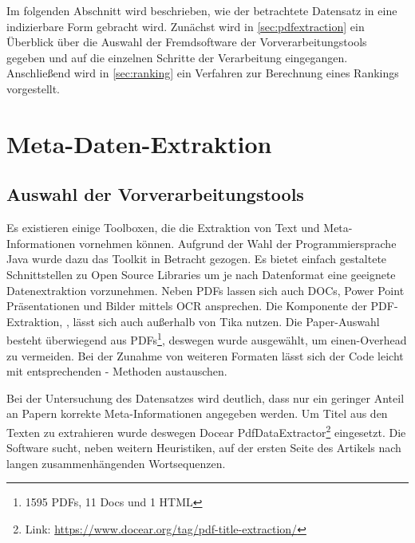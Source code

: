 


Im folgenden Abschnitt wird beschrieben, wie der betrachtete Datensatz in eine indizierbare Form
gebracht wird. Zunächst wird in \autoref{sec:pdfextraction} ein
Überblick über die Auswahl der Fremdsoftware der Vorverarbeitungstools
gegeben und auf die einzelnen Schritte der Verarbeitung eingegangen. Anschließend wird
in \autoref{sec:ranking} ein Verfahren zur Berechnung eines Rankings vorgestellt.



\section{Meta-Daten-Extraktion}\label{sec:pdfextraction}


\subsection{Auswahl der Vorverarbeitungstools}\label{sec:preprosselection}

Es existieren einige Toolboxen, die die Extraktion von Text und
Meta-Informationen vornehmen können.  Aufgrund der Wahl der
Programmiersprache Java wurde dazu das \tika Toolkit in Betracht
gezogen. Es bietet einfach gestaltete Schnittstellen zu Open Source
Libraries um je nach Datenformat eine geeignete Datenextraktion
vorzunehmen. Neben PDFs lassen sich auch DOCs, Power Point
Präsentationen und Bilder mittels OCR ansprechen. Die Komponente der
PDF-Extraktion, \pdfbox, lässt sich auch außerhalb von Tika nutzen.
Die Paper-Auswahl besteht überwiegend aus PDFs\footnote{1595 PDFs, 11
Docs und 1 HTML}, deswegen wurde \pdfbox ausgewählt, um einen-Overhead
zu vermeiden. Bei der Zunahme von weiteren Formaten lässt sich der
Code leicht mit entsprechenden \tika - Methoden austauschen.

Bei der Untersuchung des Datensatzes wird deutlich, dass nur ein
geringer Anteil an Papern korrekte Meta-Informationen angegeben werden. Um
Titel aus den Texten zu extrahieren wurde deswegen Docear
PdfDataExtractor\footnote{Link:
  \url{https://www.docear.org/tag/pdf-title-extraction/}}
eingesetzt. Die Software sucht, neben weitern Heuristiken, auf der
ersten Seite des Artikels nach langen zusammenhängenden Wortsequenzen.



